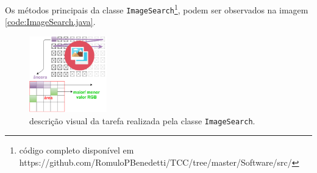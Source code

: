 \documentclass[tg]{mdtufsm}
\begin{document}
                    Os métodos principais da classe \texttt{ImageSearch}\footnote{código completo disponível em https://github.com/RomuloPBenedetti/TCC/tree/master/Software/src/}, podem ser observados na imagem \ref{code:ImageSearch.java}.

                    \begin{figure}[!htb]
                        {\centering
                        \includegraphics[width=0.3\textwidth]{imagens/searchImage.png}
                        \caption{descrição visual da tarefa realizada pela classe \texttt{ImageSearch}.}
                        \label{fig:ImageSearch}}
                    \end{figure}
\end{document}
